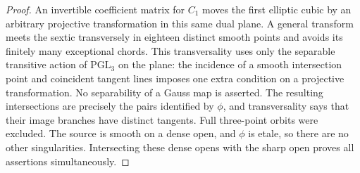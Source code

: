 \begin{proof}
An invertible coefficient matrix for $C_1$ moves the first
elliptic cubic by an arbitrary projective transformation in
this same dual plane. A general transform meets the sextic
transversely in eighteen distinct smooth points and avoids its
finitely many exceptional chords. This transversality uses only
the separable transitive action of $\mathrm{PGL}_3$ on the plane:
the incidence of a smooth intersection point and coincident
tangent lines imposes one extra condition on a projective
transformation. No separability of a Gauss map is asserted.
The resulting intersections are precisely the pairs identified
by $\phi$, and transversality says that their image branches
have distinct tangents. Full three-point orbits were excluded.
The source is smooth on a dense open, and $\phi$ is etale, so
there are no other singularities. Intersecting these dense
opens with the sharp open proves all assertions simultaneously.
\end{proof}

